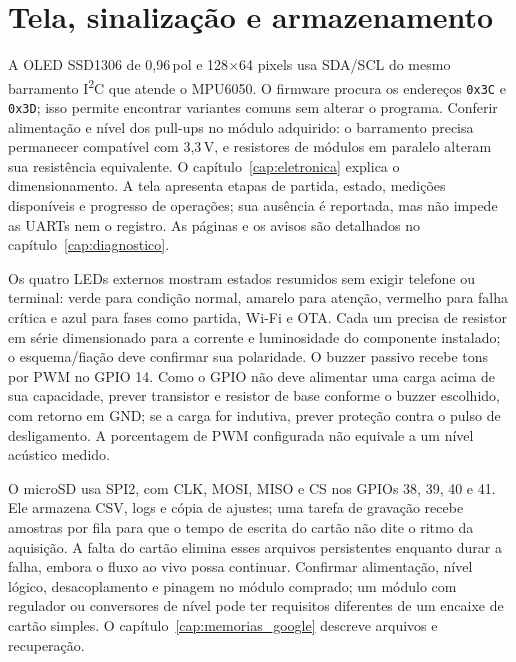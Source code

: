 \section{Tela, sinalização e armazenamento}
A OLED SSD1306 de 0,96\,pol e 128$\times$64 pixels usa SDA/SCL do mesmo barramento I\textsuperscript{2}C que atende o MPU6050. O firmware procura os endereços \texttt{0x3C} e \texttt{0x3D}; isso permite encontrar variantes comuns sem alterar o programa. Conferir alimentação e nível dos pull-ups no módulo adquirido: o barramento precisa permanecer compatível com 3,3\,V, e resistores de módulos em paralelo alteram sua resistência equivalente. O capítulo~\ref{cap:eletronica} explica o dimensionamento. A tela apresenta etapas de partida, estado, medições disponíveis e progresso de operações; sua ausência é reportada, mas não impede as UARTs nem o registro. As páginas e os avisos são detalhados no capítulo~\ref{cap:diagnostico}.

Os quatro LEDs externos mostram estados resumidos sem exigir telefone ou terminal: verde para condição normal, amarelo para atenção, vermelho para falha crítica e azul para fases como partida, Wi-Fi e OTA. Cada um precisa de resistor em série dimensionado para a corrente e luminosidade do componente instalado; o esquema/fiação deve confirmar sua polaridade. O buzzer passivo recebe tons por PWM no GPIO 14. Como o GPIO não deve alimentar uma carga acima de sua capacidade, prever transistor e resistor de base conforme o buzzer escolhido, com retorno em GND; se a carga for indutiva, prever proteção contra o pulso de desligamento. A porcentagem de PWM configurada não equivale a um nível acústico medido.

O microSD usa SPI2, com CLK, MOSI, MISO e CS nos GPIOs 38, 39, 40 e 41. Ele armazena CSV, logs e cópia de ajustes; uma tarefa de gravação recebe amostras por fila para que o tempo de escrita do cartão não dite o ritmo da aquisição. A falta do cartão elimina esses arquivos persistentes enquanto durar a falha, embora o fluxo ao vivo possa continuar. Confirmar alimentação, nível lógico, desacoplamento e pinagem no módulo comprado; um módulo com regulador ou conversores de nível pode ter requisitos diferentes de um encaixe de cartão simples. O capítulo~\ref{cap:memorias_google} descreve arquivos e recuperação.

